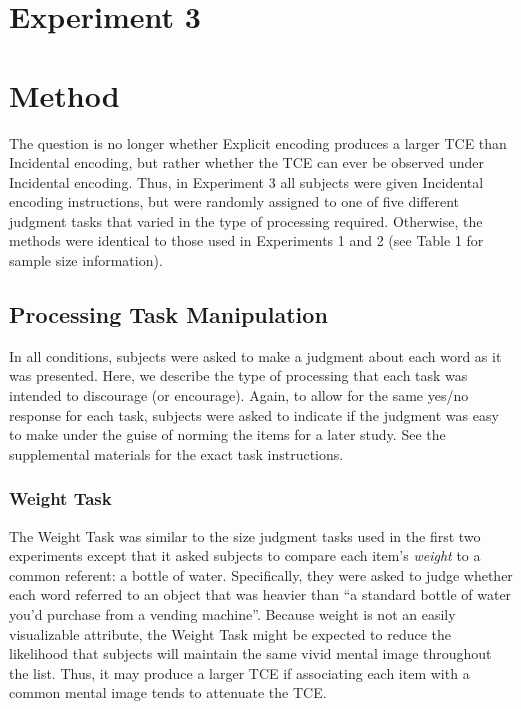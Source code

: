 \documentclass[jou,natbib]{apa6} %
\begin{document}

\section{Experiment 3}
\section{Method}
The question is no longer whether Explicit encoding produces a larger TCE than Incidental encoding, but rather whether the TCE can ever be observed under Incidental encoding. Thus, in Experiment 3 all subjects were given Incidental encoding instructions, but were randomly assigned to one of five different judgment tasks that varied in the type of processing required. Otherwise, the methods were identical to those used in Experiments 1 and 2 (see Table 1 for sample size information).

\subsection{Processing Task Manipulation}
In all conditions, subjects were asked to make a judgment about each word as it was presented. Here, we describe the type of processing that each task was intended to discourage (or encourage). Again, to allow for the same yes/no response for each task, subjects were asked to indicate if the judgment was easy to make under the guise of norming the items for a later study. See the supplemental materials for the exact task instructions.

\subsubsection{Weight Task} The Weight Task was similar to the size judgment tasks used in the first two experiments except that it asked subjects to compare each item's \emph{weight} to a common referent: a bottle of water. Specifically, they were asked to judge whether each word referred to an object that was heavier than ``a standard bottle of water you'd purchase from a vending machine''. Because weight is not an easily visualizable attribute, the Weight Task might be expected to reduce the likelihood that subjects will maintain the same vivid mental image throughout the list. Thus, it may produce a larger TCE if associating each item with a common mental image tends to attenuate the TCE.
\end{document}

